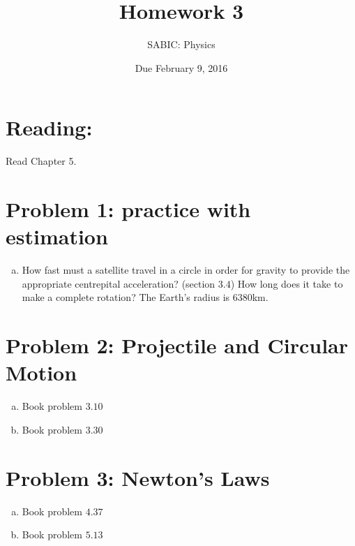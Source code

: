 \documentclass[10pt,letter]{article}
\begin{document}


\title{Homework 3}

\author{SABIC: Physics}

\date{Due February 9, 2016}
 
\maketitle 

\section*{Reading:}
Read Chapter 5.
\section*{Problem 1: practice with estimation}
\begin{enumerate}[(a)]
\item How fast must a satellite travel in a circle in order for gravity to provide the appropriate centrepital acceleration? (section $3.4$) How long does it take to make a complete rotation? The Earth's radius is $6380$km.
\end{enumerate}
\section*{Problem 2: Projectile and Circular Motion}
\begin{enumerate}[(a)]
\item Book problem $3.10$
\item Book problem $3.30$
\end{enumerate}
\section*{Problem 3: Newton's Laws}
\begin{enumerate}[(a)]
\item Book problem $4.37$
\item Book problem $5.13$
\end{enumerate}
\end{document}
